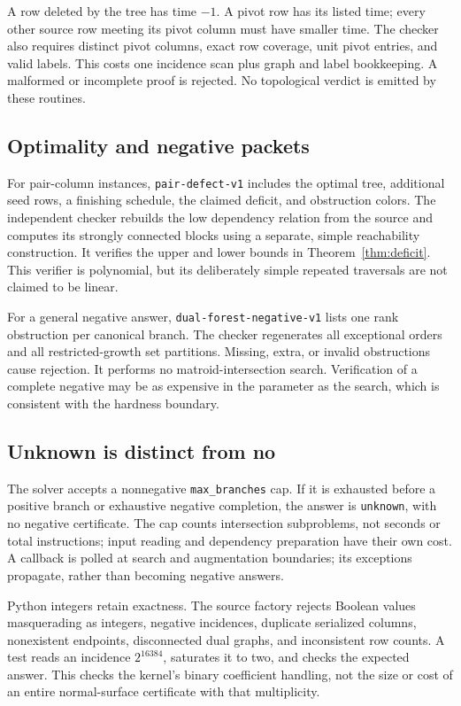 \documentclass[11pt,letterpaper]{article}
\theoremstyle{definition}
\theoremstyle{remark}
\newcommand{\code}[1]{\nolinkurl{#1}}
\begin{document}
A row deleted by the tree has time $-1$. A pivot row has its listed time; every
other source row meeting its pivot column must have smaller time. The checker
also requires distinct pivot columns, exact row coverage, unit pivot entries,
and valid labels. This costs one incidence scan plus graph and label bookkeeping.
A malformed or incomplete proof is rejected. No topological verdict is emitted
by these routines.

\subsection{Optimality and negative packets}
For pair-column instances, \code{pair-defect-v1} includes the optimal tree,
additional seed rows, a finishing schedule, the claimed deficit, and obstruction
colors. The independent checker rebuilds the low dependency relation from the
source and computes its strongly connected blocks using a separate, simple
reachability construction. It verifies the upper and lower bounds in
Theorem~\ref{thm:deficit}. This verifier is polynomial, but its deliberately
simple repeated traversals are not claimed to be linear.

For a general negative answer, \code{dual-forest-negative-v1} lists one rank
obstruction per canonical branch. The checker regenerates all exceptional
orders and all restricted-growth set partitions. Missing, extra, or invalid
obstructions cause rejection. It performs no matroid-intersection search.
Verification of a complete negative may be as expensive in the parameter as the
search, which is consistent with the hardness boundary.

\subsection{Unknown is distinct from no}
The solver accepts a nonnegative \code{max_branches} cap. If it is exhausted
before a positive branch or exhaustive negative completion, the answer is
\code{unknown}, with no negative certificate. The cap counts intersection
subproblems, not seconds or total instructions; input reading and dependency
preparation have their own cost. A callback is polled at search and augmentation
boundaries; its exceptions propagate, rather than becoming negative answers.

Python integers retain exactness. The source factory rejects Boolean values
masquerading as integers, negative incidences, duplicate serialized columns,
nonexistent endpoints, disconnected dual graphs, and inconsistent row counts.
A test reads an incidence $2^{16384}$, saturates it to two, and checks the expected
answer. This checks the kernel's binary coefficient handling, not the size or
cost of an entire normal-surface certificate with that multiplicity.
\end{document}
